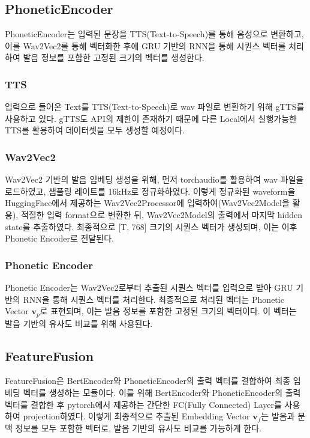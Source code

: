 \documentclass[letterpaper]{article} %
\begin{document}
\subsection{PhoneticEncoder}
PhoneticEncoder는 입력된 문장을 TTS(Text-to-Speech)를 통해 음성으로 변환하고, 이를 Wav2Vec2를 통해 벡터화한 후에 GRU 기반의 RNN을 통해 시퀀스 벡터를 처리하여 발음 정보를 포함한 고정된 크기의 벡터를 생성한다.
\subsubsection{TTS}
입력으로 들어온 Text를 TTS(Text-to-Speech)로 wav 파일로 변환하기 위해 gTTS를 사용하고 있다. gTTS도 API의 제한이 존재하기 때문에 다른 Local에서 실행가능한 TTS를 활용하여 데이터셋을 모두 생성할 예정이다.

\subsubsection{Wav2Vec2}
Wav2Vec2 기반의 발음 임베딩 생성을 위해, 먼저 torchaudio를 활용하여 wav 파일을 로드하였고, 샘플링 레이트를  16kHz로 정규화하였다. 
이렇게 정규화된 waveform을 HuggingFace에서 제공하는 Wav2Vec2Processor에 입력하여(Wav2Vec2Model을 활용), 적절한 입력 format으로 변환한 뒤, Wav2Vec2Model의 출력에서 마지막 hidden state를 추출하였다. 
최종적으로 [T, 768] 크기의 시퀀스 벡터가 생성되며, 이는 이후 Phonetic Encoder로 전달된다.

\subsubsection{Phonetic Encoder}
Phonetic Encoder는 Wav2Vec2로부터 추출된 시퀀스 벡터를 입력으로 받아 GRU 기반의 RNN을 통해 시퀀스 벡터를 처리한다.
최종적으로 처리된 벡터는 Phonetic Vector $\mathbf{v}_p$로 표현되며, 이는 발음 정보를 포함한 고정된 크기의 벡터이다. 이 벡터는 발음 기반의 유사도 비교를 위해 사용된다.


\subsection{FeatureFusion}
FeatureFusion은 BertEncoder와 PhoneticEncoder의 출력 벡터를 결합하여 최종 임베딩 벡터를 생성하는 모듈이다.
이를 위해 BertEncoder와 PhoneticEncoder의 출력 벡터를 결합한 후 pytorch에서 제공하는 간단한 FC(Fully Connected) Layer를 사용하여 projection하였다. 이렇게 최종적으로 추출된 Embedding Vector $\mathbf{v}_f$는 발음과 문맥 정보를 모두 포함한 벡터로, 발음 기반의 유사도 비교를 가능하게 한다.
\end{document}
